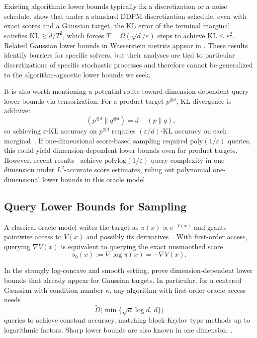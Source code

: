 \documentclass[11pt,letterpaper]{article}
\newcommand{\1}{\mathbbm{1}}
\DeclareMathOperator{\KL}{D_{\mathrm{KL}}}
\begin{document}
Existing algorithmic lower bounds typically fix a discretization or a noise schedule.
\cite{jiao2025optimalddpm} show that under a standard DDPM discretization schedule, even with exact scores and a Gaussian target, the KL error of the terminal marginal satisfies $\mathrm{KL} \gtrsim d/T^2$, which forces $T=\Omega(\sqrt d/\varepsilon)$ steps to achieve $\mathrm{KL}\le \varepsilon^2$.
Related Gaussian lower bounds in Wasserstein metrics appear in \cite{gao2025sdewasserstein}.
These results identify barriers for specific solvers, but their analyses are tied to particular discretizations of specific stochastic processes and therefore cannot be generalized to the algorithm-agnostic lower bounds we seek.

It is also worth mentioning a potential route toward dimension-dependent query lower bounds via tensorization.
For a product target $p^{\otimes d}$, KL divergence is additive:
\[
  \KL(p^{\otimes d}\|q^{\otimes d}) = d \cdot \KL(p\|q),
\]
so achieving $\varepsilon$-KL accuracy on $p^{\otimes d}$ requires $(\varepsilon/d)$-KL accuracy on each marginal~\citep{benton2023linearconvergence}.
If one-dimensional score-based sampling required $\mathrm{poly}(1/\varepsilon)$ queries, this could yield dimension-dependent lower bounds even for product targets.
However, recent results~\citep{chen2026highaccuracy} achieve $\mathrm{polylog}(1/\varepsilon)$ query complexity in one dimension under $L^2$-accurate score estimates, ruling out polynomial one-dimensional lower bounds in this oracle model.

\subsection{Query Lower Bounds for Sampling}

A classical oracle model writes the target as $\pi(x)\propto e^{-V(x)}$ and grants pointwise access to $V(x)$ and possibly its derivatives~\citep{chewi2021query1d}.
With first-order access, querying $\nabla V(x)$ is equivalent to querying the exact unsmoothed score
\[
  s_0(x):=\nabla\log\pi(x) = -\nabla V(x).
\]

In the strongly log-concave and smooth setting, \cite{chewi2023querylogconcave} prove dimension-dependent lower bounds that already appear for Gaussian targets.
In particular, for a centered Gaussian with condition number $\kappa$, any algorithm with first-order oracle access needs
\[
  \widetilde{\Omega}\big(\min\{\sqrt{\kappa}\log d,\, d\}\big)
\]
queries to achieve constant accuracy, matching block-Krylov type methods up to logarithmic factors. Sharp lower bounds are also known in one dimension~\citep{chewi2021query1d}.
\end{document}
